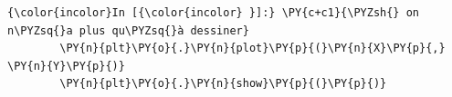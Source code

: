     \begin{Verbatim}[commandchars=\\\{\}]
{\color{incolor}In [{\color{incolor} }]:} \PY{c+c1}{\PYZsh{} on n\PYZsq{}a plus qu\PYZsq{}à dessiner}
        \PY{n}{plt}\PY{o}{.}\PY{n}{plot}\PY{p}{(}\PY{n}{X}\PY{p}{,} \PY{n}{Y}\PY{p}{)}
        \PY{n}{plt}\PY{o}{.}\PY{n}{show}\PY{p}{(}\PY{p}{)}
\end{Verbatim}
